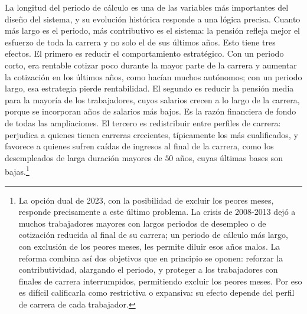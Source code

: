 \documentclass[10pt,a4paper]{article}
\begin{document}
La longitud del periodo de cálculo es una de las variables más importantes del diseño del sistema, y su evolución histórica responde a una lógica precisa. Cuanto más largo es el periodo, más contributivo es el sistema: la pensión refleja mejor el esfuerzo de toda la carrera y no solo el de sus últimos años. Esto tiene tres efectos. El primero es reducir el comportamiento estratégico. Con un periodo corto, era rentable cotizar poco durante la mayor parte de la carrera y aumentar la cotización en los últimos años, como hacían muchos autónomos; con un periodo largo, esa estrategia pierde rentabilidad. El segundo es reducir la pensión media para la mayoría de los trabajadores, cuyos salarios crecen a lo largo de la carrera, porque se incorporan años de salarios más bajos. Es la razón financiera de fondo de todas las ampliaciones. El tercero es redistribuir entre perfiles de carrera: perjudica a quienes tienen carreras crecientes, típicamente los más cualificados, y favorece a quienes sufren caídas de ingresos al final de la carrera, como los desempleados de larga duración mayores de $50$ años, cuyas últimas bases son bajas.\footnote{La opción dual de 2023, con la posibilidad de excluir los peores meses, responde precisamente a este último problema. La crisis de 2008-2013 dejó a muchos trabajadores mayores con largos periodos de desempleo o de cotización reducida al final de su carrera; un periodo de cálculo más largo, con exclusión de los peores meses, les permite diluir esos años malos. La reforma combina así dos objetivos que en principio se oponen: reforzar la contributividad, alargando el periodo, y proteger a los trabajadores con finales de carrera interrumpidos, permitiendo excluir los peores meses. Por eso es difícil calificarla como restrictiva o expansiva: su efecto depende del perfil de carrera de cada trabajador.
}
\end{document}
